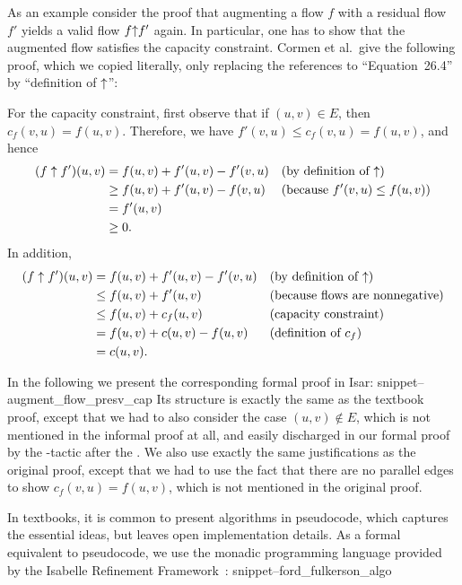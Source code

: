 \documentclass{llncs}
\newcommand{\Snippet}[1]{\csname snippet--#1\endcsname}
\begin{document}
As an example consider the proof that augmenting a flow $f$ with a residual flow $f'$ yields a valid flow $f{\mathbin\uparrow} f'$ again. In particular, one has to show 
that the augmented flow satisfies the capacity constraint. Cormen et al.~give the following proof, which we copied literally, only replacing the references to 
``Equation~26.4'' by ``definition of ${\mathbin\uparrow}$'':

For the capacity constraint, first observe that if $(u, v) \in E$, then $c_f(v, u) = f(u, v)$. Therefore, we have $f'(v,u) \leq c_f(v, u) = f(u, v)$, and hence
	\begin{align*}
	(f \uparrow f') (u, v) &= f(u, v) + f'(u, v) - f'(v, u)  && \text{(by definition of ${\mathbin\uparrow}$)} \\
	& \geq f(u, v) + f'(u, v) - f(v, u) && \text{(because $f'(v,u) \leq f(u, v)$)} \\
	& = f'(u, v) \\
	& \geq 0.
	\end{align*}
In addition,
	\begin{align*}
	(f \uparrow f') (u, v) &= f(u, v) + f'(u, v) - f'(v, u)  && \text{(by definition of ${\mathbin\uparrow}$)} \\
	& \leq f(u, v) + f'(u, v) && \text{(because flows are nonnegative)} \\
	& \leq f(u, v) + c_f(u, v) &&  \text{(capacity constraint)} \\
	& = f(u, v) + c(u, v) - f(u, v) && \text{(definition of $c_f$)} \\
	& = c (u, v).
	\end{align*}

In the following we present the corresponding formal proof in Isar:
\Snippet{augment_flow_presv_cap}
Its structure is exactly the same as the textbook proof, except that we had to also consider the case $(u,v)\notin E$, which is not mentioned in the informal proof at all, and easily discharged in our formal proof by the -tactic after the . We also use exactly the same justifications as the original proof, except that we had to use the fact that there are no parallel edges to show $c_f(v,u)=f(u,v)$, which is not mentioned in the original proof.

In textbooks, it is common to present algorithms in pseudocode, which captures the essential ideas, but leaves open implementation details. As a formal equivalent to pseudocode, we use the monadic programming language provided by the Isabelle Refinement Framework~\cite{LaTu12,La12}:
\Snippet{ford_fulkerson_algo}
\end{document}
